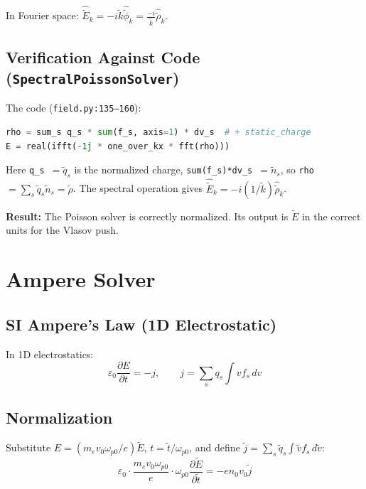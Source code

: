 \documentclass[11pt]{article}
\newcommand{\tl}[1]{\tilde{#1}}
\newcommand{\wpz}{\omega_{p0}}
\newcommand{\code}[1]{\texttt{#1}}
\newcommand{\tq}{\tl{q}}
\begin{document}
In Fourier space: $\hat{\tl{E}}_k = -i\tl{k} \hat{\tl{\phi}}_k = \frac{-i}{\tl{k}} \hat{\tl{\rho}}_k$.

\subsection{Verification Against Code (\code{SpectralPoissonSolver})}

The code (\code{field.py:135--160}):
\begin{lstlisting}[language=Python]
rho = sum_s q_s * sum(f_s, axis=1) * dv_s  # + static_charge
E = real(ifft(-1j * one_over_kx * fft(rho)))
\end{lstlisting}

Here \code{q\_s}~$= \tq_s$ is the normalized charge, \code{sum(f\_s)*dv\_s}~$= \tl{n}_s$, so \code{rho}~$= \sum_s \tq_s \tl{n}_s = \tl{\rho}$. The spectral operation gives $\hat{\tl{E}}_k = -i (1/\tl{k}) \hat{\tl{\rho}}_k$.

\begin{center}
\colorbox{green!15}{\parbox{0.85\textwidth}{
\textbf{Result:} The Poisson solver is correctly normalized. Its output is $\tl{E}$ in the correct units for the Vlasov push.
}}
\end{center}

\newpage
\section{Ampere Solver}
\label{sec:ampere}

\subsection{SI Ampere's Law (1D Electrostatic)}

In 1D electrostatics:
\begin{equation}
    \varepsilon_0 \frac{\partial E}{\partial t} = -j, \qquad j = \sum_s q_s \int v f_s \, dv
\end{equation}

\subsection{Normalization}

Substitute $E = (m_e v_0 \wpz / e) \tl{E}$, $t = \tl{t}/\wpz$, and define $\tl{j} = \sum_s \tq_s \int \tl{v} f_s \, d\tl{v}$:
\begin{equation}
    \varepsilon_0 \cdot \frac{m_e v_0 \wpz}{e} \cdot \wpz \frac{\partial \tl{E}}{\partial \tl{t}}
    = -e n_0 v_0 \tl{j}
\end{equation}
\end{document}
